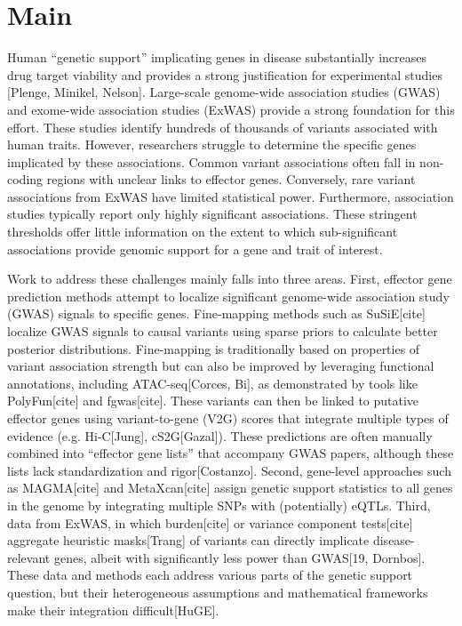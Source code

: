 \section{Main}
\label{sec:main}

Human “genetic support” implicating genes in disease substantially increases drug target viability and provides a strong justification for experimental studies [Plenge, Minikel, Nelson]. Large-scale genome-wide association studies (GWAS) and exome-wide association studies (ExWAS) provide a strong foundation for this effort. These studies identify hundreds of thousands of variants associated with human traits. However, researchers struggle to determine the specific genes implicated by these associations. Common variant associations often fall in non-coding regions with unclear links to effector genes. Conversely, rare variant associations from ExWAS have limited statistical power. Furthermore, association studies typically report only highly significant associations. These stringent thresholds offer little information on the extent to which sub-significant associations provide genomic support for a gene and trait of interest.

Work to address these challenges mainly falls into three areas. First, effector gene prediction methods attempt to localize significant genome-wide association study (GWAS) signals to specific genes. Fine-mapping methods such as SuSiE[cite] localize GWAS signals to causal variants using sparse priors to calculate better posterior distributions. Fine-mapping is traditionally based on properties of variant association strength but can also be improved by leveraging functional annotations, including ATAC-seq[Corces, Bi], as demonstrated by tools like PolyFun[cite] and fgwas[cite]. These variants can then be linked to putative effector genes using variant-to-gene (V2G) scores that integrate multiple types of evidence (e.g. Hi-C[Jung], cS2G[Gazal]). These predictions are often manually combined into “effector gene lists” that accompany GWAS papers, although these lists lack standardization and rigor[Costanzo]. Second, gene-level approaches such as MAGMA[cite] and MetaXcan[cite] assign genetic support statistics to all genes in the genome by integrating multiple SNPs with (potentially) eQTLs. Third, data from ExWAS, in which burden[cite] or variance component tests[cite] aggregate heuristic masks[Trang] of variants can directly implicate disease-relevant genes, albeit with significantly less power than GWAS[19, Dornbos]. These data and methods each address various parts of the genetic support question, but their heterogeneous assumptions and mathematical frameworks make their integration difficult[HuGE].

